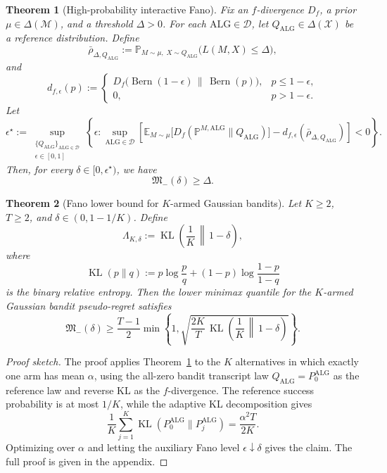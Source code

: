\documentclass[10pt,a4paper]{amsart}
\newtheorem{theorem}{Theorem}
\newcommand{\ALG}{\mathrm{ALG}}
\newcommand{\Bern}{\operatorname{Bern}}
\newcommand{\KL}{\operatorname{KL}}
\begin{document}
\begin{theorem}[High-probability interactive Fano]
\label{thm:hp-interactive-fano}
Fix an \(f\)-divergence \(D_f\), a prior \(\mu\in\Delta(\mathcal M)\), and a
threshold \(\Delta>0\). For each \(\ALG\in\mathcal D\), let
\(Q_\ALG\in\Delta(\mathcal X)\) be a reference distribution. Define
\[
\bar\rho_{\Delta,Q_\ALG}
:=
\mathbb P_{M\sim\mu,\;X\sim Q_\ALG}
\bigl(L(M,X)\le \Delta\bigr),
\]
and
\[
d_{f,\epsilon}(p)
:=
\begin{cases}
D_f\bigl(\Bern(1-\epsilon)\,\|\,\Bern(p)\bigr),
& p\le 1-\epsilon,\\[0.75ex]
0, & p>1-\epsilon.
\end{cases}
\]
Let
\[
\epsilon^\star
:=
\sup_{\substack{\{Q_\ALG\}_{\ALG\in\mathcal D}\\ \epsilon\in[0,1]}}
\left\{
\epsilon:
\sup_{\ALG\in\mathcal D}
\left[
\mathbb E_{M\sim\mu}
\bigl[
D_f(\mathbb P^{M,\ALG}\|Q_\ALG)
\bigr]
-
d_{f,\epsilon}(\bar\rho_{\Delta,Q_\ALG})
\right]
<0
\right\}.
\]
Then, for every \(\delta\in[0,\epsilon^\star)\), we have
\[
\mathfrak M_{-}(\delta)\ge \Delta.
\]
\end{theorem}

\begin{theorem}[Fano lower bound for \(K\)-armed Gaussian bandits]
\label{thm:karmed-fano-bandit}
Let \(K\ge 2\), \(T\ge 2\), and \(\delta\in(0,1-1/K)\). Define
\[
\Lambda_{K,\delta}
:=
\KL\left(\frac1K\,\middle\|\,1-\delta\right),
\]
where
\[
\KL(p\|q)
:=
p\log\frac{p}{q}
+
(1-p)\log\frac{1-p}{1-q}
\]
is the binary relative entropy. Then the lower minimax quantile for the
\(K\)-armed Gaussian bandit pseudo-regret satisfies
\[
\mathfrak M_-(\delta)
\ge
\frac{T-1}{2}
\min\left\{
1,
\sqrt{
\frac{2K}{T}
\,
\KL\left(\frac1K\,\middle\|\,1-\delta\right)
}
\right\}.
\]
\end{theorem}

\begin{proof}[Proof sketch]
The proof applies Theorem~\ref{thm:hp-interactive-fano} to the \(K\) alternatives
in which exactly one arm has mean \(\alpha\), using the all-zero bandit
transcript law \(Q_\ALG=P_0^\ALG\) as the reference law and reverse KL as the
\(f\)-divergence. The reference success probability is at most \(1/K\), while
the adaptive KL decomposition gives
\[
\frac1K\sum_{j=1}^K \KL(P_0^\ALG\|P_j^\ALG)
=
\frac{\alpha^2T}{2K}.
\]
Optimizing over \(\alpha\) and letting the auxiliary Fano level
\(\epsilon\downarrow\delta\) gives the claim. The full proof is given in the appendix.
\end{proof}
\end{document}
